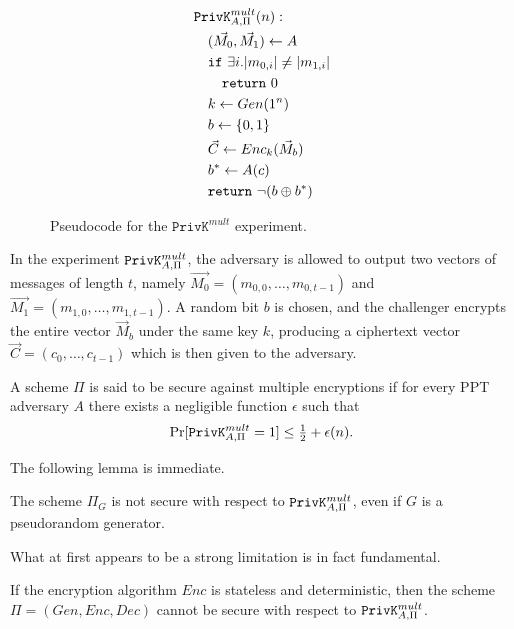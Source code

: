 \begin{figure}[htpb]
    \centering
    \begin{align*}
    &\mathtt{PrivK}^{mult}_{A,\Pi}(n): \\
    &\quad (\vec{M_0}, \vec{M_1}) \gets A \\
    &\quad \mathtt{if}\,\,\exists i. |m_{0,i}| \neq |m_{1,i}| \\
    &\quad\quad \mathtt{return}\,\,0 \\
    &\quad k \gets Gen(1^n) \\
    &\quad b \gets \{0,1\} \\
    &\quad \vec{C} \gets Enc_k(\vec{M}_b) \\
    &\quad b^* \gets A(c) \\
    &\quad \mathtt{return}\,\, \neg(b \oplus b^*)
    \end{align*}
    \caption{Pseudocode for the $\mathtt{PrivK}^{mult}$ experiment.}
    \label{fig:privk-mult}
\end{figure}
In the experiment $\mathtt{PrivK}^{mult}_{A,\Pi}$, the adversary is allowed to output two vectors of messages of length $t$, namely $\vec{M_0} = (m_{0,0}, \dots , m_{0,t-1})$ and $\vec{M_1} = (m_{1,0}, \dots , m_{1,t-1})$. A random bit $b$ is chosen, and the challenger encrypts the entire vector $\vec{M}_b$ under the same key $k$, producing a ciphertext vector $\vec{C} = (c_0, \dots, c_{t-1})$ which is then given to the adversary.
\begin{definition}
A scheme $\Pi$ is said to be secure against multiple encryptions if for every PPT adversary $A$ there exists a negligible function $\epsilon$ such that
\begin{align}
\Pr[\mathtt{PrivK}^{mult}_{A,\Pi} = 1] \leq \tfrac{1}{2} + \epsilon(n).
\end{align}
\end{definition}

The following lemma is immediate.

\begin{lemma}
The scheme $\Pi_G$ is not secure with respect to $\mathtt{PrivK}^{mult}_{A,\Pi}$, even if $G$ is a pseudorandom generator.
\end{lemma}

What at first appears to be a strong limitation is in fact fundamental.

\begin{theorem}
If the encryption algorithm $Enc$ is stateless and deterministic, then the scheme $\Pi = (Gen, Enc, Dec)$ cannot be secure with respect to $\mathtt{PrivK}^{mult}_{A,\Pi}$.
\end{theorem}

